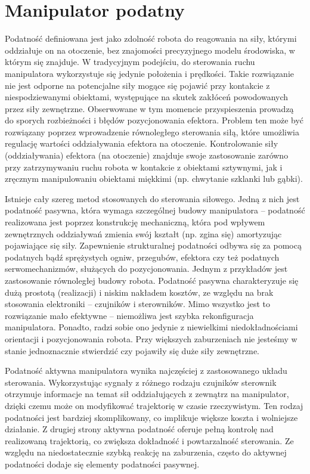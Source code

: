 \documentclass[printmode]{mgr}
\begin{document}
\section{Manipulator podatny}\label{sec:podatnosc}
Podatność \cite{handbook} definiowana jest jako zdolność robota do reagowania na siły, którymi oddziałuje on na otoczenie,
bez znajomości precyzyjnego modelu środowiska, w którym się znajduje. W tradycyjnym podejściu, 
do sterowania ruchu manipulatora wykorzystuje się jedynie położenia i prędkości.
Takie rozwiązanie nie jest odporne na potencjalne siły mogące się pojawić przy kontakcie z niespodziewanymi obiektami, 
występujące na skutek zakłóceń powodowanych przez siły zewnętrzne. Obserwowane
w tym momencie przyspieszenia prowadzą do sporych rozbieżności i błędów pozycjonowania efektora. Problem ten może być
rozwiązany poprzez wprowadzenie równoległego sterowania siłą, które umożliwia regulację wartości oddziaływania efektora
na otoczenie. Kontrolowanie siły (oddziaływania) efektora (na otoczenie) znajduje swoje zastosowanie zarówno 
przy zatrzymywaniu ruchu robota w kontakcie z
obiektami sztywnymi, jak i zręcznym manipulowaniu obiektami miękkimi (np. chwytanie szklanki lub gąbki).

Istnieje cały szereg metod stosowanych do sterowania siłowego. Jedną z nich jest podatność pasywna, która wymaga
szczególnej budowy manipulatora -- podatność realizowana jest poprzez konstrukcję mechaniczną, która pod wpływem zewnętrznych
oddziaływań zmienia swój kształt (np. zgina się) amortyzując pojawiające się siły. 
Zapewnienie strukturalnej podatności odbywa się za pomocą podatnych bądź sprężystych ogniw, przegubów, efektora
czy też podatnych serwomechanizmów, służących do pozycjonowania. Jednym z przykładów jest zastosowanie
równoległej budowy robota. Podatność pasywna charakteryzuje się dużą prostotą (realizacji) i niskim nakładem kosztów, ze względu na
brak stosowania elektroniki -- czujników i sterowników. Mimo wszystko jest to rozwiązanie mało efektywne -- niemożliwa jest
szybka rekonfiguracja manipulatora. Ponadto, radzi sobie ono jedynie z niewielkimi niedokładnościami orientacji i pozycjonowania robota.
Przy większych zaburzeniach nie jesteśmy w stanie jednoznacznie stwierdzić czy pojawiły się duże siły zewnętrzne.

Podatność aktywna manipulatora wynika najczęściej z zastosowanego układu sterowania. Wykorzystując sygnały z
różnego rodzaju czujników sterownik otrzymuje informacje na temat sił oddziałujących z zewnątrz na manipulator, dzięki
czemu może on modyfikować trajektorię w czasie rzeczywistym. Ten rodzaj podatności jest bardziej skomplikowany,
co implikuje większe koszta i wolniejsze działanie. Z drugiej strony aktywna podatność oferuje pełną kontrolę nad
realizowaną trajektorią, co zwiększa dokładność i powtarzalność sterowania. Ze względu na niedostatecznie szybką reakcję
na zaburzenia, często do aktywnej podatności dodaje się elementy podatności pasywnej.
\end{document}
